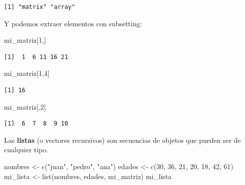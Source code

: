 \documentclass[
  letterpaper,
  DIV=11,
  numbers=noendperiod]{scrartcl}
\newenvironment{Shaded}{\begin{snugshade}}{\end{snugshade}}
\newcommand{\DecValTok}[1]{\textcolor[rgb]{0.68,0.00,0.00}{#1}}
\newcommand{\FunctionTok}[1]{\textcolor[rgb]{0.28,0.35,0.67}{#1}}
\newcommand{\NormalTok}[1]{\textcolor[rgb]{0.00,0.23,0.31}{#1}}
\newcommand{\OtherTok}[1]{\textcolor[rgb]{0.00,0.23,0.31}{#1}}
\newcommand{\StringTok}[1]{\textcolor[rgb]{0.13,0.47,0.30}{#1}}
\begin{document}
\begin{verbatim}
[1] "matrix" "array" 
\end{verbatim}

Y podemos extraer elementos con subsetting:

\begin{Shaded}
\begin{Highlighting}[]
\NormalTok{mi\_matriz[}\DecValTok{1}\NormalTok{,]}
\end{Highlighting}
\end{Shaded}

\begin{verbatim}
[1]  1  6 11 16 21
\end{verbatim}

\begin{Shaded}
\begin{Highlighting}[]
\NormalTok{mi\_matriz[}\DecValTok{1}\NormalTok{,}\DecValTok{4}\NormalTok{]}
\end{Highlighting}
\end{Shaded}

\begin{verbatim}
[1] 16
\end{verbatim}

\begin{Shaded}
\begin{Highlighting}[]
\NormalTok{mi\_matriz[,}\DecValTok{2}\NormalTok{]}
\end{Highlighting}
\end{Shaded}

\begin{verbatim}
[1]  6  7  8  9 10
\end{verbatim}

Las \textbf{listas} (o vectores recursivos) son secuencias de objetos
que pueden ser de cualquier tipo.

\begin{Shaded}
\begin{Highlighting}[]
\NormalTok{nombres }\OtherTok{\textless{}{-}} \FunctionTok{c}\NormalTok{(}\StringTok{"juan"}\NormalTok{, }\StringTok{"pedro"}\NormalTok{, }\StringTok{"ana"}\NormalTok{) }
\NormalTok{edades }\OtherTok{\textless{}{-}} \FunctionTok{c}\NormalTok{(}\DecValTok{30}\NormalTok{, }\DecValTok{36}\NormalTok{, }\DecValTok{21}\NormalTok{, }\DecValTok{20}\NormalTok{, }\DecValTok{18}\NormalTok{, }\DecValTok{42}\NormalTok{, }\DecValTok{61}\NormalTok{) }
\NormalTok{mi\_lista }\OtherTok{\textless{}{-}} \FunctionTok{list}\NormalTok{(nombres, edades, mi\_matriz) }
\NormalTok{mi\_lista}
\end{Highlighting}
\end{Shaded}
\end{document}
